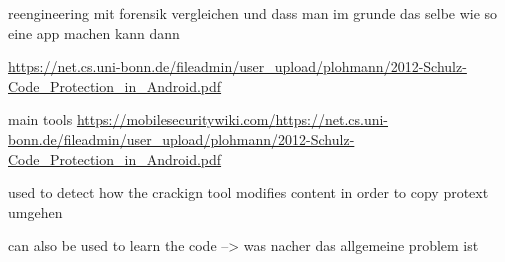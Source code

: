 reengineering mit forensik vergleichen und dass man im grunde das selbe wie so eine app machen kann dann\newline

\url{https://net.cs.uni-bonn.de/fileadmin/user_upload/plohmann/2012-Schulz-Code_Protection_in_Android.pdf}\newline

main tools\newline
\url{https://mobilesecuritywiki.com/}\newline \url{https://net.cs.uni-bonn.de/fileadmin/user_upload/plohmann/2012-Schulz-Code_Protection_in_Android.pdf}\newline

used to detect how the crackign tool modifies content in order to copy protext umgehen\newline


can also be used to learn the code --> was nacher das allgemeine problem ist\newline
